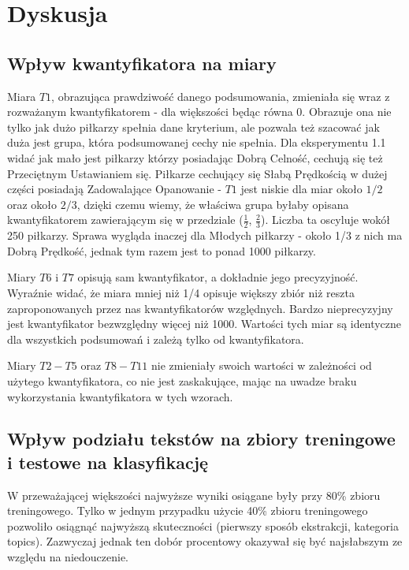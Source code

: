 \documentclass{classrep}
\begin{document}
\section{Dyskusja}

\subsection{Wpływ kwantyfikatora na miary}

Miara $T1$, obrazująca prawdziwość danego podsumowania, zmieniała się wraz z rozważanym kwantyfikatorem - dla większości będąc równa 0. Obrazuje ona nie tylko jak dużo piłkarzy spełnia dane kryterium, ale pozwala też szacować jak duża jest grupa, która podsumowanej cechy nie spełnia. Dla eksperymentu 1.1 widać jak mało jest piłkarzy którzy posiadając Dobrą Celność, cechują się też Przeciętnym Ustawianiem się. Piłkarze cechujący się Słabą Prędkością w dużej części posiadają Zadowalające Opanowanie - $T1$ jest niskie dla miar około $1/2$ oraz około $2/3$, dzięki czemu wiemy, że właściwa grupa byłaby opisana kwantyfikatorem zawierającym się w przedziale ($\frac{1}{2}$, $\frac{2}{3}$). Liczba ta oscyluje wokół 250 piłkarzy. Sprawa wygląda inaczej dla Młodych piłkarzy - około 1/3 z nich ma Dobrą Prędkość, jednak tym razem jest to ponad 1000 piłkarzy. 
\newline

Miary $T6$ i $T7$ opisują sam kwantyfikator, a dokładnie jego precyzyjność. Wyraźnie widać, że miara mniej niż 1/4 opisuje większy zbiór niż reszta zaproponowanych przez nas kwantyfikatorów względnych. Bardzo nieprecyzyjny jest kwantyfikator bezwzględny więcej niż 1000. Wartości tych miar są identyczne dla wszystkich podsumowań i zależą tylko od kwantyfikatora.

Miary $T2-T5$ oraz $T8-T11$ nie zmieniały swoich wartości w zależności od użytego kwantyfikatora, co nie jest zaskakujące, mając na uwadze braku wykorzystania kwantyfikatora w tych wzorach. 

\subsection{Wpływ podziału tekstów na zbiory treningowe i testowe na klasyfikację}
W przeważającej większości najwyższe wyniki osiągane były przy 80\% zbioru treningowego. Tylko w jednym przypadku użycie 40\% zbioru treningowego pozwoliło osiągnąć najwyższą skuteczności (pierwszy sposób ekstrakcji, kategoria topics). Zazwyczaj jednak ten dobór procentowy okazywał się być najsłabszym ze względu na niedouczenie. 
\newline
\end{document}
